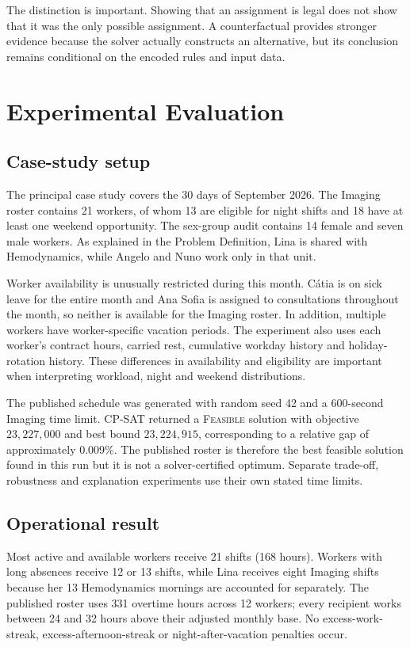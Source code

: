 \documentclass[11pt,a4paper]{article}
\begin{document}
The distinction is important. Showing that an assignment is legal does not show that it was the only possible assignment. A counterfactual provides stronger evidence because the solver actually constructs an alternative, but its conclusion remains conditional on the encoded rules and input data.

\section{Experimental Evaluation}

\subsection{Case-study setup}

The principal case study covers the 30 days of September 2026. The Imaging roster contains 21 workers, of whom 13 are eligible for night shifts and 18 have at least one weekend opportunity. The sex-group audit contains 14 female and seven male workers. As explained in the Problem Definition, Lina is shared with Hemodynamics, while Angelo and Nuno work only in that unit.

Worker availability is unusually restricted during this month. C\'atia is on sick leave for the entire month and Ana Sofia is assigned to consultations throughout the month, so neither is available for the Imaging roster. In addition, multiple workers have worker-specific vacation periods. The experiment also uses each worker's contract hours, carried rest, cumulative workday history and holiday-rotation history. These differences in availability and eligibility are important when interpreting workload, night and weekend distributions.

The published schedule was generated with random seed 42 and a 600-second Imaging time limit. CP-SAT returned a \textsc{Feasible} solution with objective $23{,}227{,}000$ and best bound $23{,}224{,}915$, corresponding to a relative gap of approximately 0.009\%. The published roster is therefore the best feasible solution found in this run but it is not a solver-certified optimum. Separate trade-off, robustness and explanation experiments use their own stated time limits.

\subsection{Operational result}

Most active and available workers receive 21 shifts (168 hours). Workers with long absences receive 12 or 13 shifts, while Lina receives eight Imaging shifts because her 13 Hemodynamics mornings are accounted for separately. The published roster uses 331 overtime hours across 12 workers; every recipient works between 24 and 32 hours above their adjusted monthly base. No excess-work-streak, excess-afternoon-streak or night-after-vacation penalties occur.
\end{document}

